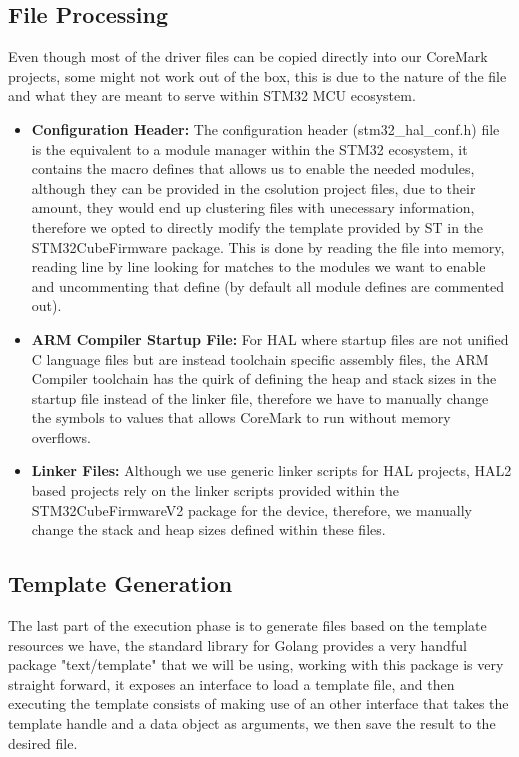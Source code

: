 \subsection{File Processing}
Even though most of the driver files can be copied directly into our CoreMark projects, some might not work out of the box, this is due to the nature of the file and what they are meant to serve within STM32 MCU ecosystem.
\begin{itemize}
    \item \textbf{Configuration Header:} The configuration header (stm32\_hal\_conf.h) file is the equivalent to a module manager within the STM32 ecosystem, it contains the macro defines that allows us to enable the needed modules, although they can be provided in the csolution project files, due to their amount, they would end up clustering files with unecessary information, therefore we opted to directly modify the template provided by ST in the STM32CubeFirmware package. This is done by reading the file into memory, reading line by line looking for matches to the modules we want to enable and uncommenting that define (by default all module defines are commented out).
    \item \textbf{ARM Compiler Startup File:} For HAL where startup files are not unified C language files but are instead toolchain specific assembly files, the ARM Compiler toolchain has the quirk of defining the heap and stack sizes in the startup file instead of the linker file, therefore we have to manually change the symbols to values that allows CoreMark to run without memory overflows.
    \item \textbf{Linker Files:} Although we use generic linker scripts for HAL projects, HAL2 based projects rely on the linker scripts provided within the STM32CubeFirmwareV2 package for the device, therefore, we manually change the stack and heap sizes defined within these files.
\end{itemize}
\subsection{Template Generation}
The last part of the execution phase is to generate files based on the template resources we have, the standard library for Golang provides a very handful package "text/template" that we will be using, working with this package is very straight forward, it exposes an interface to load a template file, and then executing the template consists of making use of an other interface that takes the template handle and a data object as arguments, we then save the result to the desired file.
